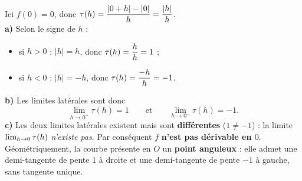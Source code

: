 \begin{corr}[4 --- $f(x)=|x|$ en $x_0=0$]
Ici $f(0)=0$, donc $\displaystyle \tau(h)=\frac{|0+h|-|0|}{h}=\frac{|h|}{h}$.\\[3pt]
\textbf{a)} Selon le signe de $h$ :
\begin{itemize}[leftmargin=6mm,itemsep=1pt]
  \item si $h>0$ : $|h|=h$, donc $\displaystyle\tau(h)=\frac{h}{h}=1$ ;
  \item si $h<0$ : $|h|=-h$, donc $\displaystyle\tau(h)=\frac{-h}{h}=-1$.
\end{itemize}
\textbf{b)} Les limites latérales sont donc
\[
\lim_{h\to 0^+}\tau(h)=1
\qquad\text{et}\qquad
\lim_{h\to 0^-}\tau(h)=-1.
\]
\textbf{c)} Les deux limites latérales existent mais sont \textbf{différentes}
($1\neq -1$) : la limite $\lim_{h\to 0}\tau(h)$ \emph{n'existe pas}. Par conséquent
$f$ \textbf{n'est pas dérivable en $0$}. Géométriquement, la courbe présente en $O$
un \textbf{point anguleux} : elle admet une demi-tangente de pente $1$ à droite et
une demi-tangente de pente $-1$ à gauche, sans tangente unique.

\begin{center}
\end{center}
\end{corr}


